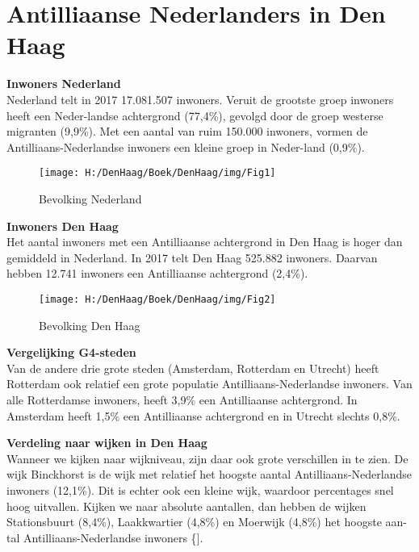 \documentclass[]{book}
\begin{document}
\hypertarget{antilliaanse-nederlanders-in-den-haag}{%
\chapter*{Antilliaanse Nederlanders in Den
Haag}\label{antilliaanse-nederlanders-in-den-haag}}

\textbf{Inwoners Nederland}\\
Nederland telt in 2017 17.081.507 inwoners. Veruit de grootste groep
inwoners heeft een Neder-landse achtergrond (77,4\%), gevolgd door de
groep westerse migranten (9,9\%). Met een aantal van ruim 150.000
inwoners, vormen de Antilliaans-Nederlandse inwoners een kleine groep in
Neder-land (0,9\%).

\begin{figure}
\texttt{[image: H:/DenHaag/Boek/DenHaag/img/Fig1]} \caption{Bevolking Nederland}\label{fig:unnamed-chunk-1}
\end{figure}

\textbf{Inwoners Den Haag}\\
Het aantal inwoners met een Antilliaanse achtergrond in Den Haag is
hoger dan gemiddeld in Nederland. In 2017 telt Den Haag 525.882
inwoners. Daarvan hebben 12.741 inwoners een Antilliaanse achtergrond
(2,4\%).

\begin{figure}
\texttt{[image: H:/DenHaag/Boek/DenHaag/img/Fig2]} \caption{Bevolking Den Haag}\label{fig:unnamed-chunk-2}
\end{figure}

\textbf{Vergelijking G4-steden}\\
Van de andere drie grote steden (Amsterdam, Rotterdam en Utrecht) heeft
Rotterdam ook relatief een grote populatie Antilliaans-Nederlandse
inwoners. Van alle Rotterdamse inwoners, heeft 3,9\% een Antilliaanse
achtergrond. In Amsterdam heeft 1,5\% een Antilliaanse achtergrond en in
Utrecht slechts 0,8\%.

\textbf{Verdeling naar wijken in Den Haag}\\
Wanneer we kijken naar wijkniveau, zijn daar ook grote verschillen in te
zien. De wijk Binckhorst is de wijk met relatief het hoogste aantal
Antilliaans-Nederlandse inwoners (12,1\%). Dit is echter ook een kleine
wijk, waardoor percentages snel hoog uitvallen. Kijken we naar absolute
aantallen, dan hebben de wijken Stationsbuurt (8,4\%), Laakkwartier
(4,8\%) en Moerwijk (4,8\%) het hoogste aan-tal Antilliaans-Nederlandse
inwoners \{\citet{Haag2017}{]}.
\end{document}
